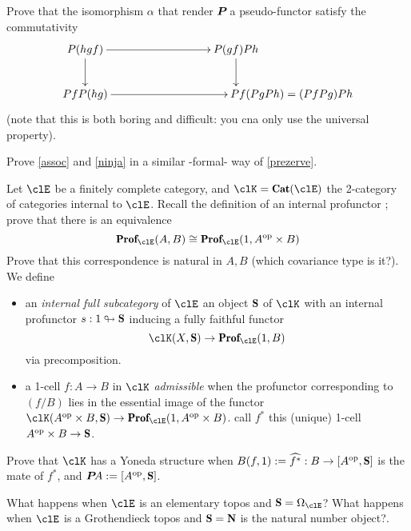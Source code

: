 \begin{exercise}[\faExclamationTriangle] Prove that the isomorphism $\alpha$
that render $\P$ a pseudo-functor satisfy the commutativity
\[ \xymatrix{ P(hgf)\ar[d]\ar[rr] && P(gf)Ph\ar[d]\\ Pf P(hg)\ar[rr] && **[r]
Pf(Pg Ph) = (Pf Pg)Ph }
\] (note that this is both boring and difficult: you cna only use the universal
property).
\end{exercise}
\begin{exercise} Prove \ref{assoc} and \ref{ninja} in a similar -formal- way of
\ref{prezerve}.
\end{exercise}
\begin{exercise}[\faExclamationTriangle]\label{profu} Let $\clE$ be a finitely
complete category, and $\clK = \Cat(\clE)$ the 2-category of categories internal
to $\clE$. Recall the definition of an internal profunctor \cite[8.2.1,
8.4.3]{Bor1}; prove that there is an equivalence
\[ \cate{Prof}_{\clE}(A,B) \cong \cate{Prof}_{\clE}(1,A^\opp\times B)
\] Prove that this correspondence is natural in $A,B$ (which covariance type is
it?). We define
\begin{itemize}
	\item an \emph{internal full subcategory} of $\clE$ an object $\cate{S}$ of
$\clK$ with an internal profunctor $s : 1 \pto \cate{S}$ inducing a fully
faithful functor
	\[\clK(X,\cate{S}) \to \cate{Prof}_{\clE}(1,B)\] via precomposition.
	\item a 1-cell $f : A\to B$ in $\clK$ \emph{admissible} when the profunctor
corresponding to $(f/B)$ lies in the essential image of the functor
$\clK(A^\opp\times B,\cate{S}) \to \cate{Prof}_{\clE}(1,A^\opp\times B)$. call
$f^*$ this (unique) 1-cell $A^\opp\times B \to \cate{S}$.
\end{itemize} Prove that $\clK$ has a Yoneda structure when $B(f,1) :=
\widehat{f^*} : B \to [A^\opp,\cate{S}]$ is the mate of $f^*$, and $\P A :=
[A^\opp,\cate{S}]$.

What happens when $\clE$ is an elementary topos and $\cate{S}=\Omega_{\clE}$?
What happens when $\clE$ is a Grothendieck topos and $\cate S = \cate{N}$ is the
natural number object?.
\end{exercise}
